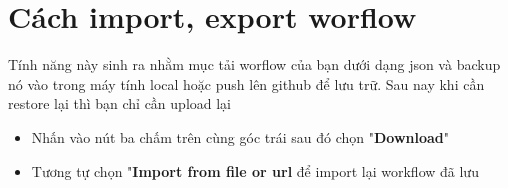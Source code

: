 \section{Cách import, export worflow}
Tính năng này sinh ra nhằm mục tải worflow của bạn dưới dạng json và backup nó vào trong máy tính local hoặc push lên github để lưu trữ. Sau nay khi cần restore lại thì bạn chỉ cần upload lại 

\begin{itemize}
    \item Nhấn vào nút ba chấm trên cùng góc trái sau đó chọn "\textbf{Download}"
    \item Tương tự chọn "\textbf{Import from file or url} để import lại workflow đã lưu 
\end{itemize}